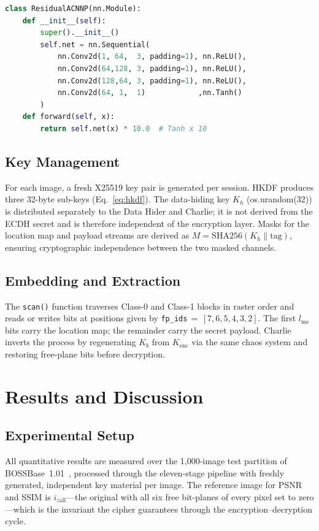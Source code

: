 \documentclass[runningheads]{llncs}
\begin{document}
\begin{lstlisting}[language=Python,
  caption={ResidualACNNP model (PyTorch)},
  label={lst:model}]
class ResidualACNNP(nn.Module):
    def __init__(self):
        super().__init__()
        self.net = nn.Sequential(
            nn.Conv2d(1, 64,  3, padding=1), nn.ReLU(),
            nn.Conv2d(64,128, 3, padding=1), nn.ReLU(),
            nn.Conv2d(128,64, 3, padding=1), nn.ReLU(),
            nn.Conv2d(64, 1,  1)            ,nn.Tanh()
        )
    def forward(self, x):
        return self.net(x) * 10.0  # Tanh x 10
\end{lstlisting}

\subsection{Key Management}
For each image, a fresh X25519 key pair is generated per
session. HKDF produces three 32-byte sub-keys (Eq.~\ref{eq:hkdf}).
The data-hiding key $K_h$ (os.urandom(32)) is distributed
separately to the Data Hider and Charlie; it is not derived
from the ECDH secret and is therefore independent of the
encryption layer. Masks for the location map and payload
streams are derived as
$M=\mathrm{SHA256}(K_h\!\parallel\!\text{tag})$, ensuring
cryptographic independence between the two masked channels.

\subsection{Embedding and Extraction}
The \texttt{scan()} function traverses Class-0 and Class-1
blocks in raster order and reads or writes bits at positions
given by \texttt{fp\_ids}\,$=$\,$[7,6,5,4,3,2]$.
The first $l_\text{ms}$ bits carry the location map;
the remainder carry the secret payload. Charlie inverts the
process by regenerating $K_b$ from $K_\text{enc}$ via the
same chaos system and restoring free-plane bits before
decryption.

\section{Results and Discussion}
\label{sec:results}

\subsection{Experimental Setup}
All quantitative results are measured over the 1,000-image
test partition of BOSSBase~1.01~\cite{ref13}, processed
through the eleven-stage pipeline with freshly generated,
independent key material per image. The reference image for
PSNR and SSIM is $i_{z\text{all}}$---the original with all
six free bit-planes of every pixel set to zero---which is the
invariant the cipher guarantees through the
encryption--decryption cycle.
\end{document}
